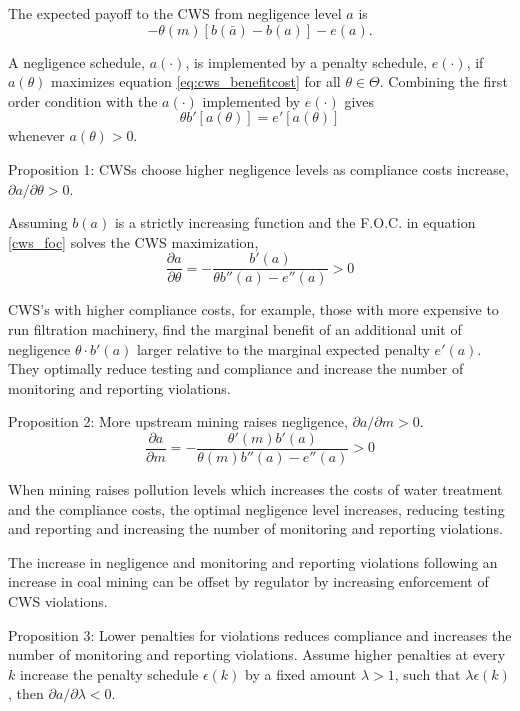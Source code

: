 \documentclass{article}
\begin{document}
The expected payoff to the CWS from negligence level $a$ is
\begin{equation}\label{eq:cws_benefitcost}
    -\theta(m)[b(\bar{a})-b(a)]-e(a).
\end{equation}

A negligence schedule, $a(\cdot)$, is implemented by a penalty schedule, $e(\cdot)$, if $a(\theta)$ maximizes equation \ref{eq:cws_benefitcost} for all $\theta \in \Theta$. Combining the first order condition with the $a(\cdot)$ implemented by $e(\cdot)$ gives
\begin{equation}\label{cws_foc}
    \theta b'[a(\theta)]=e'[a(\theta)]
\end{equation}
whenever $a(\theta)>0$.

Proposition 1: CWSs choose higher negligence levels as compliance costs increase, $\partial a/ \partial \theta>0$.

Assuming $b(a)$ is a strictly increasing function and the F.O.C. in equation \ref{cws_foc} solves the CWS maximization,
\[\frac{\partial a}{\partial \theta}=-\frac{b'(a)}{\theta b''(a)-e''(a)}>0\]

CWS's with higher compliance costs, for example, those with more expensive to run filtration machinery, find the marginal benefit of an additional unit of negligence $\theta·b'(a)$ larger relative to the marginal expected penalty $e'(a)$. They optimally reduce testing and compliance and increase the number of monitoring and reporting violations.

Proposition 2: More upstream mining raises negligence, $\partial a/\partial m >0$.
\[\frac{\partial a}{\partial m}=-\frac{\theta'(m)b'(a)}{\theta(m) b''(a)-e''(a)}>0\]

When mining raises pollution levels which increases the costs of water treatment and the compliance costs, the optimal negligence level increases, reducing testing and reporting and increasing the number of monitoring and reporting violations. 

The increase in negligence and monitoring and reporting violations following an increase in coal mining can be offset by regulator by increasing enforcement of CWS violations.

Proposition 3: Lower penalties for violations reduces compliance and increases the number of monitoring and reporting violations. Assume higher penalties at every $k$ increase the penalty schedule $\epsilon(k)$ by a fixed amount $\lambda>1$, such that $\lambda\epsilon(k)$, then $\partial a/\partial \lambda<0$.
\end{document}
